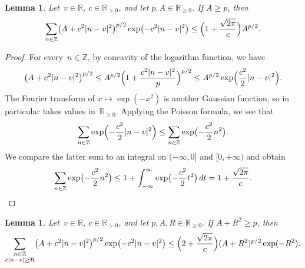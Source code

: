\documentclass[12pt,oneside]{amsart}
\numberwithin{equation}{section}
\newtheorem{lem}[equation]{Lemma}
\theoremstyle{definition}
\newcommand{\Z}{\mathbb{Z}}
\newcommand{\R}{\mathbb{R}}
\DeclarePairedDelimiter{\abs}{|}{|}
\DeclarePairedDelimiter{\paren}{(}{)}
\begin{document}
\begin{lem}
  \label{lem:dim1-bound-full}
  Let~$v\in \R$, $c \in \R_{>0}$, and let $p, A \in\R_{\geq 0}$.  If
  $A\geq p$, then
  \begin{displaymath}
    \sum_{n\in \Z} \paren[\big]{A+ c^2\abs{n - v}^2}^{p/2} \exp\paren[\big]{-c^2\abs{n - v}^2}
    \leq \paren[\Big]{1 + \frac{\sqrt{2\pi}}{c}} A^{p/2}.
  \end{displaymath}
\end{lem}
\begin{proof}
  For every~$n\in \Z$, by concavity of the logarithm function, we have
  \begin{displaymath}
    \paren[\big]{A + c^2\abs{n-v}^2}^{p/2}
    \leq A^{p/2} \paren[\Big]{1 + \frac{c^2\abs{n-v}^2}{p}}^{p/2}
    \leq A^{p/2} \exp \paren[\Big]{\frac{c^2}{2} \abs{n-v}^2}.
  \end{displaymath}
  The Fourier transform of $x\mapsto \exp(-x^2)$ is another Gaussian function,
  so in particular takes values in~$\R_{\geq 0}$. Applying the Poisson formula, we
  see that
  \begin{displaymath}
    \sum_{n\in \Z} \exp\paren[\Big]{-\frac{c^2}{2}\abs{n-v}^2}
    \leq \sum_{n\in \Z} \exp\paren[\big]{-\frac{c^2}{2} n^2}.
  \end{displaymath}
  We compare the latter sum to an integral on $(-\infty,0]$ and $[0,+\infty)$
  and obtain
  \begin{displaymath}
    \sum_{n\in \Z} \exp\paren[\big]{-\frac{c^2}{2}n^2}
    \leq 1 + \int_{-\infty}^\infty \exp \paren[\big]{-\frac{c^2}{2}t^2}\,dt
    = 1 + \frac{\sqrt{2\pi}}{c}. \qedhere
  \end{displaymath}
\end{proof}

\begin{lem}
  \label{lem:dim1-bound}
  Let~$v\in \R$, $c \in \R_{>0}$, and let $p, A, R \in\R_{\geq 0}$.  If
  $A + R^2\geq p$, then
  \begin{displaymath}
    \sum_{\substack{n\in \Z\\ c\abs{n-v}\geq R}}
    \paren[\big]{A+c^2\abs{n - v}^2}^{p/2} \exp\paren[\big]{-c^2\abs{n - v}^2}
    \leq \paren[\Big]{2 + \frac{\sqrt{2\pi}}{c}} (A+R^2)^{p/2} \exp(-R^2).
  \end{displaymath}
\end{lem}
\end{document}
